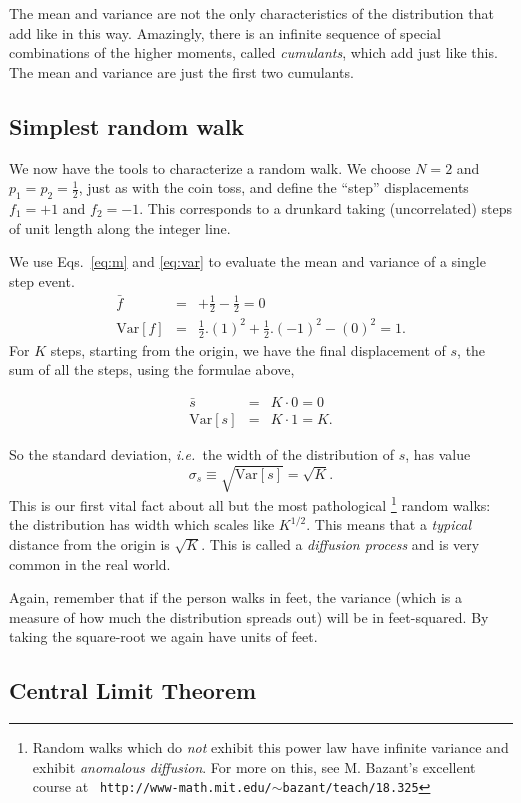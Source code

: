 \documentclass[12pt,letterpaper]{report}
\newcommand\be{\begin{equation}}
\newcommand\ee{\end{equation}}
\newcommand\bea{\begin{eqnarray}}
\newcommand\eea{\end{eqnarray}}
\newcommand\ie{{\it i.e.\ }}
\newcommand{\var}{\text{Var}}
\begin{document}
The mean and variance are not the only characteristics of the
distribution that add like in this way. Amazingly, there is an
infinite sequence of special combinations of the higher moments,
called {\em cumulants}, which add just like this. The mean and
variance are just the first two cumulants.



\subsection{Simplest random walk}

We now have the tools to characterize a random walk. We choose
$N=2$ and $p_1 = p_2 = \frac{1}{2}$, just as with the coin toss,
and define the ``step'' displacements $f_1 = +1$ and $f_2 = -1$.
This corresponds to a drunkard taking (uncorrelated) steps of unit
length along the integer line.

We use Eqs.~\ref{eq:m} and \ref{eq:var} to evaluate the mean and
variance of a single step event. \bea \bar{f} &=& +\frac{1}{2} -
\frac{1}{2} = 0 \\ \var[f] &=& \frac{1}{2}. (1)^2 + \frac{1}{2}.
(-1)^2  - (0)^2 = 1. \eea For $K$ steps, starting from the origin,
we have the final displacement of $s$, the sum of all the steps,
using the formulae above,

\bea \bar{s} & = & K \cdot 0 = 0 \\ \var[s] & = & K \cdot 1  = K.
\eea

So the standard deviation, \ie the width of the distribution of
$s$, has value \be \sigma_s \equiv \sqrt{\var[s]} = \sqrt{K}. \ee
This is our first vital fact about all but the most pathological
\footnote{Random walks which do {\em not} exhibit this power law
have infinite variance and exhibit {\em anomalous diffusion}. For
more on this, see M. Bazant's excellent course at {\tt
http://www-math.mit.edu/$\sim$bazant/teach/18.325}} random walks:
the distribution has width which scales like $K^{1/2}$. This means
that a {\em typical} distance from the origin is $\sqrt{K}$. This
is called a {\em diffusion process} and is very common in the real
world.

Again, remember that if the person walks in feet, the variance
(which is a measure of how much the distribution spreads out) will
be in feet-squared. By taking the square-root we again have units
of feet.

\subsection{Central Limit Theorem}
\end{document}
